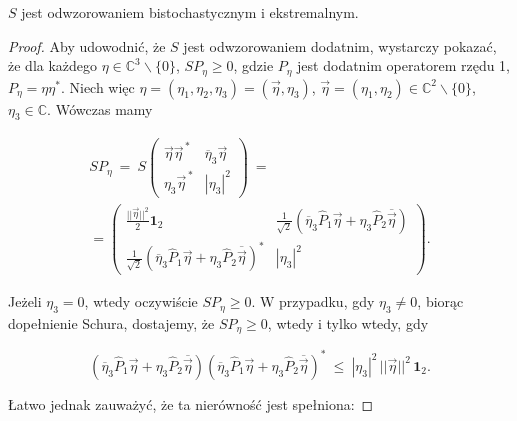 {\pagebreak
\begin{Lemma}
\label{lem:SIsExtremal}
$S$ jest odwzorowaniem bistochastycznym i ekstremalnym.
\end{Lemma}

\begin{proof}
Aby udowodnić, że $S$ jest odwzorowaniem dodatnim,
wystarczy pokazać, że dla każdego $\eta \in \mathbb{C}^{3}\backslash\{0\}$,
$SP_{\eta} \geq 0$,
gdzie $P_{\eta}$ jest dodatnim operatorem rzędu 1,
$P_{\eta} = \eta \eta^{*}$.
Niech więc
$\eta = (\eta_{1}, \eta_{2}, \eta_{3}) = (\vec{\eta}, \eta_{3})$,
$\vec{\eta} = (\eta_{1}, \eta_{2}) \in \mathbb{C}^{2}\backslash\{0\}$,
$\eta_{3} \in \mathbb{C}$.
Wówczas mamy
\begin{linenomath*}
 \begin{multline}
 SP_{\eta} \:=\:  S \begin{pmatrix}
    \vec{\eta} \vec{\eta}^{\,*} & \overline{\eta}_{3} \vec{\eta} \\
    \eta_{3} \vec{\eta}^{\,*}   & |\eta_{3}|^{2}
 \end{pmatrix} \: = \: \\
 = \begin{pmatrix}
  \frac{||\vec{\eta}||^{2}}{2} \mathbf{1}_{2} &
        \frac{1}{\sqrt{2}} \left ( \overline{\eta}_{3} \hat{P}_{1} \vec{\eta} +
          \eta_{3} \hat{P}_{2} \overline{\vec{\eta}} \right) \\
\frac{1}{\sqrt{2}} \left ( \overline{\eta}_{3} \hat{P}_{1} \vec{\eta} +
          \eta_{3} \hat{P}_{2} \overline{\vec{\eta}} \right)^{*} &
        |\eta_{3}|^{2}
 \end{pmatrix}.
 \end{multline}
\end{linenomath*}
Jeżeli $\eta_{3} = 0$, wtedy oczywiście $SP_{\eta} \geq 0$.
W przypadku, gdy $\eta_{3} \neq 0$,
biorąc dopełnienie Schura,
dostajemy, że $SP_{\eta} \geq 0$, wtedy i tylko wtedy, gdy
\begin{linenomath*}
 \begin{equation}
\label{ieq:SchurForS}
   \left ( \overline{\eta}_{3} \hat{P}_{1} \vec{\eta} +
    \eta_{3} \hat{P}_{2} \overline{\vec{\eta}} \right)
   \left ( \overline{\eta}_{3} \hat{P}_{1} \vec{\eta} +
    \eta_{3} \hat{P}_{2} \overline{\vec{\eta}} \right)^{*}
    \: \leq \:
        |\eta_{3}|^{2} \, ||\vec{\eta}||^{2} \, \mathbf{1}_{2}.
 \end{equation}
\end{linenomath*}
Łatwo jednak zauważyć, że ta nierówność jest spełniona:

\end{proof}}
